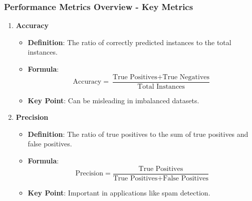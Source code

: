 \documentclass{beamer}
\begin{document}
\begin{frame}[fragile]
    \frametitle{Performance Metrics Overview - Key Metrics}
    \begin{enumerate}
        \item \textbf{Accuracy}
        \begin{itemize}
            \item \textbf{Definition}: The ratio of correctly predicted instances to the total instances.
            \item \textbf{Formula}:
            \begin{equation}
                \text{Accuracy} = \frac{\text{True Positives} + \text{True Negatives}}{\text{Total Instances}}
            \end{equation}
            \item \textbf{Key Point}: Can be misleading in imbalanced datasets.
        \end{itemize}
        
        \item \textbf{Precision}
        \begin{itemize}
            \item \textbf{Definition}: The ratio of true positives to the sum of true positives and false positives.
            \item \textbf{Formula}:
            \begin{equation}
                \text{Precision} = \frac{\text{True Positives}}{\text{True Positives} + \text{False Positives}}
            \end{equation}
            \item \textbf{Key Point}: Important in applications like spam detection.
        \end{itemize}
        
    \end{enumerate}
\end{frame}
\end{document}
